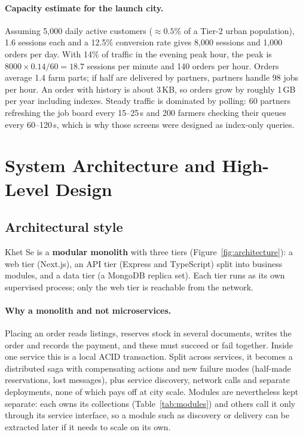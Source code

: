 \documentclass[manuscript,screen,review]{acmart}
\begin{document}
\paragraph{Capacity estimate for the launch city.} Assuming 5{,}000 daily active customers ($\approx 0.5\%$ of a Tier-2 urban population), 1.6 sessions each and a 12.5\% conversion rate gives 8{,}000 sessions and 1{,}000 orders per day. With 14\% of traffic in the evening peak hour, the peak is $8000 \times 0.14 / 60 = 18.7$ sessions per minute and 140 orders per hour. Orders average 1.4 farm parts; if half are delivered by partners, partners handle 98 jobs per hour. An order with history is about 3\,KB, so orders grow by roughly 1\,GB per year including indexes. Steady traffic is dominated by polling: 60 partners refreshing the job board every 15--25\,s and 200 farmers checking their queues every 60--120\,s, which is why those screens were designed as index-only queries.

\section{System Architecture and High-Level Design}
\label{sec:architecture}

\subsection{Architectural style}

Khet Se is a \textbf{modular monolith} with three tiers (Figure~\ref{fig:architecture}): a web tier (Next.js), an API tier (Express and TypeScript) split into business modules, and a data tier (a MongoDB replica set). Each tier runs as its own supervised process; only the web tier is reachable from the network.

\paragraph{Why a monolith and not microservices.} Placing an order reads listings, reserves stock in several documents, writes the order and records the payment, and these must succeed or fail together. Inside one service this is a local ACID transaction. Split across services, it becomes a distributed saga with compensating actions and new failure modes (half-made reservations, lost messages), plus service discovery, network calls and separate deployments, none of which pays off at city scale. Modules are nevertheless kept separate: each owns its collections (Table~\ref{tab:modules}) and others call it only through its service interface, so a module such as discovery or delivery can be extracted later if it needs to scale on its own.
\end{document}
